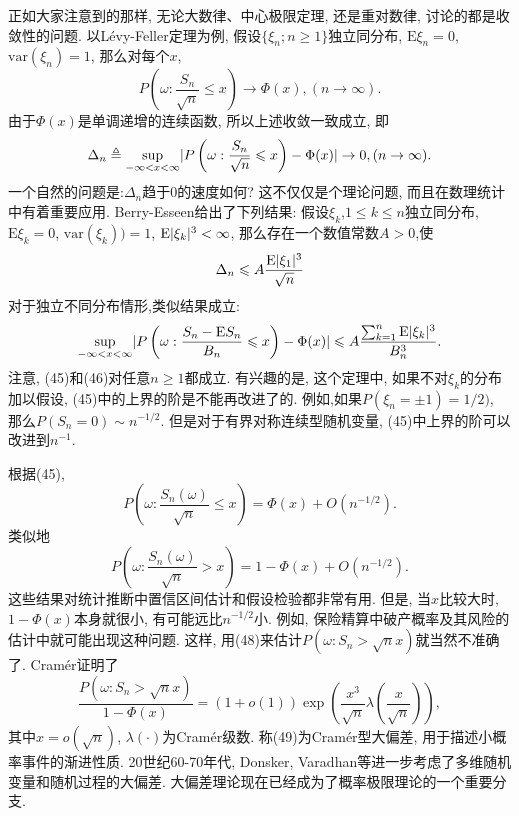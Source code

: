 正如大家注意到的那样, 无论大数律、中心极限定理, 还是重对数律, 讨论的都是收敛性的问题. 以Lévy-Feller定理为例, 假设$\{\xi_n;n\geqslant 1\}$独立同分布, $\mathrm{E}\xi_n = 0$,$\mathrm{var}(\xi_n) = 1$, 那么对每个$x$,\begin{equation}
P\left( \omega:\frac{S_n}{\sqrt{n}}\leqslant x \right)\to\Phi(x), (n\to\infty).
\end{equation}
由于$\Phi(x)$是单调递增的连续函数, 所以上述收敛一致成立, 即\begin{equation}
\Delta_n\triangleq \sup_{-\infty<x<\infty}\lvert P\left( \omega:\frac{S_n}{\sqrt{n}}\leqslant x \right)-\Phi(x)\rvert\to 0,(n\to\infty).
\end{equation}
一个自然的问题是:$\Delta_n$趋于0的速度如何? 这不仅仅是个理论问题, 而且在数理统计中有着重要应用. Berry-Esseen给出了下列结果: 假设$\xi_k$,$1\leqslant k\leqslant n$独立同分布, $\mathrm{E}\xi_k = 0$, $\mathrm{var}(\xi_k)) = 1$, $\mathrm{E}\lvert\xi_k\rvert^3<\infty$, 那么存在一个数值常数$A>0$,使\begin{equation}
\Delta_n\leqslant A\frac{\mathrm{E}\lvert\xi_1\rvert^3}{\sqrt{n}}
\end{equation}
对于独立不同分布情形,类似结果成立:
\begin{equation}
\sup_{-\infty<x<\infty}\lvert P\left( \omega:\frac{S_n-\mathrm{E}S_n}{B_n}\leqslant x \right)-\Phi(x)\rvert\leqslant A\frac{\sum_{k=1}^n\mathrm{E}\lvert\xi_k\rvert^3}{B_n^3}.
\end{equation}
注意, (45)和(46)对任意$n\geqslant 1$都成立. 有兴趣的是, 这个定理中, 如果不对$\xi_k$的分布加以假设, (45)中的上界的阶是不能再改进了的. 例如,如果$P(\xi_n = \pm 1)=1/2)$, 那么$P(S_n = 0) \sim n^{-1/2}$. 但是对于有界对称连续型随机变量, (45)中上界的阶可以改进到$n^{-1}$.

根据(45),\begin{equation}
P(\omega:\frac{S_n(\omega)}{\sqrt{n}}\leqslant x) = \Phi(x)+O(n^{-1/2}).
\end{equation}
类似地\begin{equation}
P(\omega:\frac{S_n(\omega)}{\sqrt{n}}> x) = 1-\Phi(x)+O(n^{-1/2}).
\end{equation}
这些结果对统计推断中置信区间估计和假设检验都非常有用. 但是, 当$x$比较大时, $1-\Phi(x)$本身就很小, 有可能远比$n^{-1/2}$小. 例如, 保险精算中破产概率及其风险的估计中就可能出现这种问题. 这样, 用(48)来估计$P(\omega:S_n>\sqrt{n}x)$就当然不准确了. Cramér证明了\begin{equation}
\frac{P(\omega:S_n>\sqrt{n}x)}{1-\Phi(x)} = (1+o(1))\exp(\frac{x^3}{\sqrt{n}}\lambda(\frac{x}{\sqrt{n}})),
\end{equation}
其中$x=o(\sqrt{n})$, $\lambda(\cdot)$为Cramér级数. 称(49)为Cramér型大偏差, 用于描述小概率事件的渐进性质. 20世纪60-70年代, Donsker, Varadhan等进一步考虑了多维随机变量和随机过程的大偏差. 大偏差理论现在已经成为了概率极限理论的一个重要分支.

